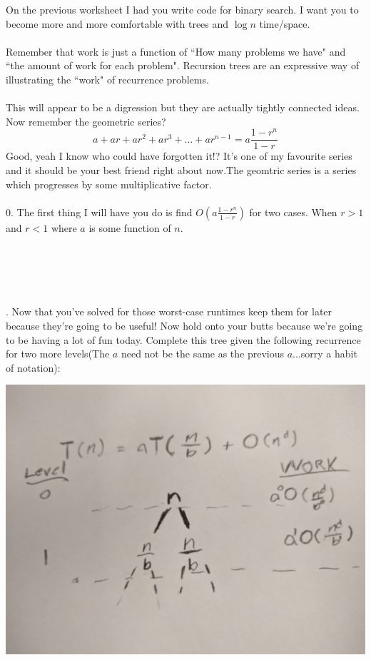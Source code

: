 \documentclass[12pt]{article}
\begin{document}
\newpage
\noindent On the previous worksheet I had you write code for binary search. I want you to become more and more comfortable with trees and $\log{n}$ time/space. \\\\
Remember that work is just a function of ``How many problems we have" and ``the amount of work for each problem". Recursion trees are an expressive way of illustrating the ``work" of recurrence problems.\\\\
This will appear to be a digression but they are actually tightly connected ideas. Now remember the geometric series?
$$a + ar + ar^2+ar^3+\dots + ar^{n-1} = a\frac{1-r^n}{1-r}$$
Good, yeah I know who could have forgotten it!? It's one of my favourite series and it should be your best friend right about now.The geomtric series is a series which progresses by some multiplicative factor. \\\\
0. The first thing I will have you do is find $O(a\frac{1-r^{n}}{1-r})$ for two cases. When $r>1$ and $r<1$ where $a$ is some function of $n$.\\\\\\\\\\\\
\newpage
{}. Now that you've solved for those worst-case runtimes keep them for later because they're going to be useful! Now hold onto your butts because we're going to be having a lot of fun today. Complete this tree given the following recurrence for two more levels(The $a$ need not be the same as the previous $a$...sorry a habit of notation):\\
\centerline{\includegraphics[scale = 0.05]{tree.jpg}} 
\end{document}
